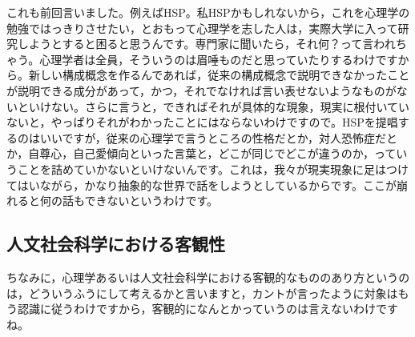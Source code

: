 \documentclass{ltjsbook}
\begin{document}
これも前回言いました。例えばHSP。私HSPかもしれないから，これを心理学の勉強ではっきりさせたい，とおもって心理学を志した人は，実際大学に入って研究しようとすると困ると思うんです。専門家に聞いたら，それ何？って言われちゃう。心理学者は全員，そういうのは眉唾ものだと思っていたりするわけですから。新しい構成概念を作るんであれば，従来の構成概念で説明できなかったことが説明できる成分があって，かつ，それでなければ言い表せないようなものがないといけない。さらに言うと，できればそれが具体的な現象，現実に根付いていないと，やっぱりそれがわかったことにはならないわけですので。HSPを提唱するのはいいですが，従来の心理学で言うところの性格だとか，対人恐怖症だとか，自尊心，自己愛傾向といった言葉と，どこが同じでどこが違うのか，っていうことを詰めていかないといけないんです。これは，我々が現実現象に足はつけてはいながら，かなり抽象的な世界で話をしようとしているからです。ここが崩れると何の話もできないというわけです。

\subsection{人文社会科学における客観性}

ちなみに，心理学あるいは人文社会科学における客観的なもののあり方というのは，どういうふうにして考えるかと言いますと，カントが言ったように対象はもう認識に従うわけですから，客観的になんとかっていうのは言えないわけですね。
\end{document}
